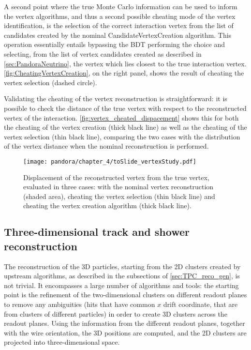 A second point where the true Monte Carlo information can be used to inform the vertex algorithms, and thus a second possible cheating mode of the vertex identification, is the selection of the correct interaction vertex from the list of candidates created by the nominal CandidateVertexCreation algorithm. This operation essentially entails bypassing the BDT performing the choice and selecting, from the list of vertex candidates created as described in \autoref{sec:PandoraNeutrino}, the vertex which lies closest to the true interaction vertex. \autoref{fig:CheatingVertexCreation}, on the right panel, shows the result of cheating the vertex selection (dashed circle). 

Validating the cheating of the vertex reconstruction is straightforward: it is possible to check the distance of the true vertex with respect to the reconstructed vertex of the interaction. \autoref{fig:vertex_cheated_dispacement} shows this for both the cheating of the vertex creation (thick black line) as well as the cheating of the vertex selection (thin black line), comparing the two cases with the distribution of the vertex distance when the nominal reconstruction is performed. 

\begin{figure}
    \centering
    \texttt{[image: pandora/chapter\_4/toSlide\_vertexStudy.pdf]}
    \caption[Vertex displacement from truth]{Displacement of the reconstructed vertex from the true vertex, evaluated in three cases: with the nominal vertex reconstruction (shaded area), cheating the vertex selection (thin black line) and cheating the vertex creation algorithm (thick black line). }
    \label{fig:vertex_cheated_dispacement}
\end{figure}


\subsection{Three-dimensional track and shower reconstruction}

The reconstruction of the 3D particles, starting from the 2D clusters created by upstream algorithms, as described in the subsections of \autoref{sec:TPC_reco_gen}, is not trivial. It encompasses a large number of algorithms and tools: the starting point is the refinement of the two-dimensional clusters on different readout planes to remove any ambiguities (hits that have common $x$ drift coordinate, that are from clusters of different particles) in order to create 3D clusters across the readout planes. Using the information from the different readout planes, together with the wire orientation, the 3D positions are computed, and the 2D clusters are projected into three-dimensional space. 

